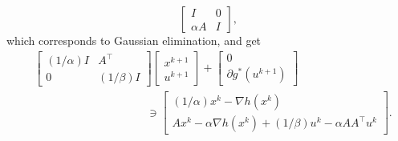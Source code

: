 \documentclass[10pt,mathserif]{beamer}
\begin{document}
\begin{frame}
\[\begin{bmatrix}
I&0\\
\alpha A&I
\end{bmatrix},
\]
which corresponds to Gaussian elimination,
and get
\begin{align*}
  &\begin{bmatrix}
    (1/\alpha)I & A^\intercal  \\
    0 & (1/\beta)I
  \end{bmatrix}
  \begin{bmatrix}
        x^{k+1} \\
         u ^{k+1}
  \end{bmatrix}
  +
  \begin{bmatrix}
  0\\
  \partial g^*( u ^{k+1})
  \end{bmatrix}\\
  &\qquad\qquad\qquad\qquad\qquad\ni
    \begin{bmatrix}
  (1/\alpha)x^k-\nabla h(x^k)\\
  Ax^k-\alpha \nabla h(x^k)+
  (1/\beta) u ^k-\alpha A A^\intercal u ^k
  \end{bmatrix}.
\end{align*}
\end{frame}
\end{document}
